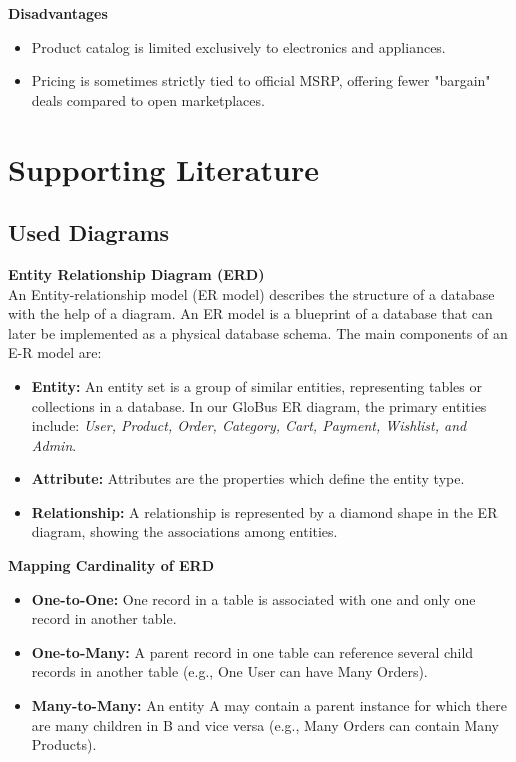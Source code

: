 \textbf{Disadvantages}
\begin{itemize}
    \item Product catalog is limited exclusively to electronics and appliances.
    \item Pricing is sometimes strictly tied to official MSRP, offering fewer "bargain" deals compared to open marketplaces.
\end{itemize}

\section{Supporting Literature}
\subsection{Used Diagrams}
\textbf{Entity Relationship Diagram (ERD)}\\
An Entity-relationship model (ER model) describes the structure of a database with the help of a diagram. An ER model is a blueprint of a database that can later be implemented as a physical database schema. The main components of an E-R model are:
\begin{itemize}
    \item \textbf{Entity:} An entity set is a group of similar entities, representing tables or collections in a database. In our GloBus ER diagram, the primary entities include: \textit{User, Product, Order, Category, Cart, Payment, Wishlist, and Admin}.
    \item \textbf{Attribute:} Attributes are the properties which define the entity type.
    \item \textbf{Relationship:} A relationship is represented by a diamond shape in the ER diagram, showing the associations among entities.
\end{itemize}

\textbf{Mapping Cardinality of ERD}
\begin{itemize}
    \item \textbf{One-to-One:} One record in a table is associated with one and only one record in another table.
    \item \textbf{One-to-Many:} A parent record in one table can reference several child records in another table (e.g., One User can have Many Orders).
    \item \textbf{Many-to-Many:} An entity A may contain a parent instance for which there are many children in B and vice versa (e.g., Many Orders can contain Many Products).
\end{itemize}

